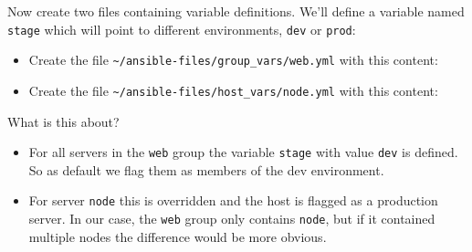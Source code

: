 \begin{Shaded}
\begin{Highlighting}[]
\ExtensionTok{[student@controller}\NormalTok{ ansible{-}files]$ mkdir host\_vars group\_vars}
\end{Highlighting}
\end{Shaded}

Now create two files containing variable definitions. We'll define a
variable named \texttt{stage} which will point to different
environments, \texttt{dev} or \texttt{prod}:

\begin{itemize}
\tightlist
\item
  Create the file
  \texttt{\textasciitilde{}/ansible-files/group\_vars/web.yml} with this
  content:
\end{itemize}

\begin{Shaded}
\begin{Highlighting}[]
\PreprocessorTok{{-}{-}{-}}
\KeywordTok{:}
\end{Highlighting}
\end{Shaded}

\begin{itemize}
\tightlist
\item
  Create the file
  \texttt{\textasciitilde{}/ansible-files/host\_vars/node.yml} with
  this content:
\end{itemize}

\begin{Shaded}
\begin{Highlighting}[]
\PreprocessorTok{{-}{-}{-}}
\KeywordTok{:}
\end{Highlighting}
\end{Shaded}

What is this about?

\begin{itemize}
\tightlist
\item
  For all servers in the \texttt{web} group the variable \texttt{stage}
  with value \texttt{dev} is defined. So as default we flag them as
  members of the dev environment.
\item
  For server \texttt{node} this is overridden and the host is flagged
  as a production server. In our case, the \texttt{web} group only contains
  \texttt{node}, but if it contained multiple nodes the difference would be
  more obvious.
\end{itemize}

